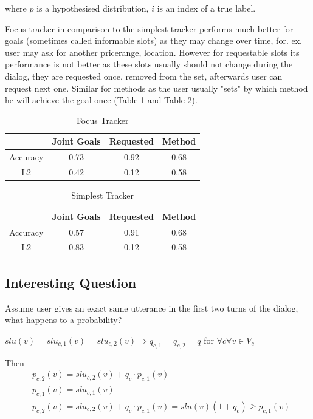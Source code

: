 \documentclass[12pt,titlepage,a4paper]{article}
\begin{document}
\noindent
where $p$ is a hypothesised distribution, $i$ is an index of a true label. 

Focus tracker in comparison to the simplest tracker performs much better for goals (sometimes called informable slots) as they may change over time, for. ex. user may ask for another pricerange, location. However for request\-able slots its performance is not better as these slots usually should not change during the dialog, they are requested once, removed from the set, afterwards user can request next one. Similar for methods as the user usually "sets" by which method he will achieve the goal once (Table \ref{focus_tracker_results} and Table \ref{baseline_tracker_results}).

\begin{table}[ht]
    \centering
    \begin{tabular}{|c c c c|}
    \hline
                & Joint Goals & Requested & Method \\
    \hline
    Accuracy   & 0.73        & 0.92      & 0.68 \\ 
    L2         & 0.42        & 0.12      & 0.58 \\
    \hline
    \end{tabular}
    \caption{Focus Tracker}
    \label{focus_tracker_results}
\end{table}
\begin{table}[ht]
    \centering
    \begin{tabular}{|c c c c|}
    \hline
                & Joint Goals   & Requested & Method \\ 
    \hline
    Accuracy   & 0.57          & 0.91      & 0.68 \\ 
    L2         & 0.83          & 0.12      & 0.58  \\
    \hline
    \end{tabular}
    \caption{Simplest Tracker}
    \label{baseline_tracker_results}
\end{table}

\subsection{Interesting Question}
Assume user gives an exact same utterance in the first two turns of the dialog, what happens to a probability?

$slu(v) = slu_{c, 1}(v) = slu_{c,2}(v) \Rightarrow q_{c,1} = q_{c, 2} = q$ for $\forall c \forall v \in V_c $

\noindent Then
\begin{align*}
    &p_{c,2}(v) = slu_{c,2}(v) + q_c \cdot p_{c, 1}(v) 
    \\
    &p_{c,1}(v) = slu_{c,1}(v)
    \\
    &p_{c, 2}(v) = slu_{c,2}(v) + q_c \cdot p_{c, 1}(v) = slu(v)(1 + q_c) \geq p_{c,1}(v)
\end{align*}
\end{document}
